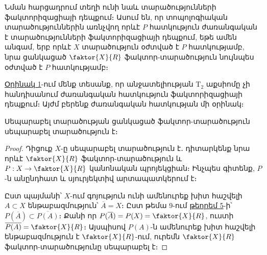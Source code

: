 \documentclass[./main.tex]{subfiles}
\begin{document}
\par Նման հարցադրում տեղի ունի նաև տարածությունների ֆակտորիզացիայի դեպ\-քում։ Ասում են, որ տոպոլոգիական տարածություններին առնչվող որևէ $P$ հատ\-կու\-թյուն ժառանգական է տարածությունների ֆակտորիզացիայի դեպքում, եթե ամեն անգամ, երբ որևէ $X$ տարածություն օժտված է $P$ հատկությամբ, նրա ցանկացած $\faktor{X}{R}$ ֆակտոր-տարածություն նույնպես օժտված է $P$ հատկությամբ։

\par \hyperref[ch12ex1]{Օրինակ 1}-ում մենք տեսանք, որ անջատելիության $\textrm{T}_2$ աքսիոմը չի հանդիսանում ժառանգական հատկություն ֆակտորիզացիայի դեպքում։ Այժմ բերենք ժառան\-գա\-կան հատկության մի օրինակ։

\begin{theorem}\label{ch12thm3}
Սեպարաբել տարածության ցանկացած ֆակտոր-տարածություն սե\-պարաբել տարածություն է։
\end{theorem}

\begin{proof}
\par Դիցուք $X$-ը սեպարաբել տարածություն է․ դիտարկենք նրա որևէ $\faktor{X}{R}$ ֆակտոր-տարածություն և $P: X \to \faktor{X}{R}$ կանոնական պրոյեկցիան։ Ինչպես գիտենք, $P$-ն անընդհատ և սյուրյեկտիվ արտապատկերում է։

\par Ըստ պայմանի՝ $X$-ում գոյություն ունի ամենուրեք խիտ հաշվելի $A \subset X$ ենթա\-բազ\-մություն՝ $\overline{A} = X$։ Ըստ թեմա 9-ում \hyperref[ch9thm5]{թեորեմ 5}-ի՝ $P(\overline{A}) \subset \overline{P(A)}$։ Քանի որ \linebreak $P(\overline{A}) = P(X) = \faktor{X}{R}$, ուստի $\overline{P(A)} = \faktor{X}{R}$։
Այսպիսով $P(A)$-ն ամենուրեք խիտ հաշ\-վե\-լի ենթա\-բազ\-մու\-թյուն է $\faktor{X}{R}$-ում, ուրեմն $\faktor{X}{R}$ ֆակտոր-տարա\-ծու\-թյու\-նը սե\-պա\-րա\-բել է։
\end{proof}



\end{document}
